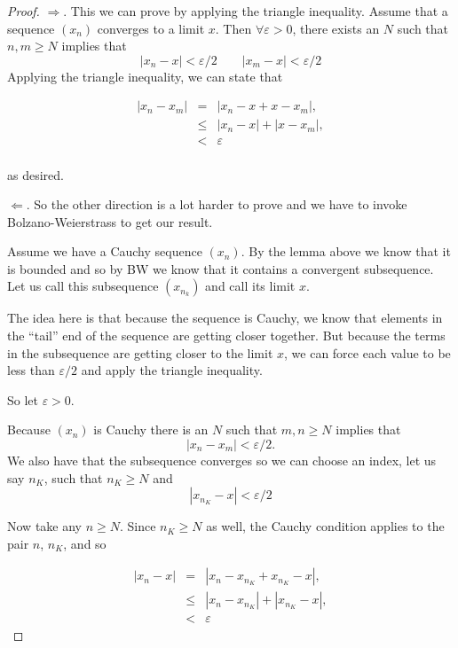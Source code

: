 \begin{proof}
	$\Longrightarrow$.  This we can prove by applying the triangle inequality. Assume that a sequence $(x_n)$ converges to a limit $x$.   Then $\forall \varepsilon >0$, there exists an $N$ such that $n,m \geq N$ implies that 
	\[ |x_n -x | < \varepsilon/2	\qquad 	|x_m - x| < \varepsilon/2	\]
Applying the triangle inequality, we can state that 

$$
\begin{array}{rcl}
|x_n - x_m| &=& |x_n - x  + x - x_m| ,\\
&\leq & |x_n - x| + |x - x_m|,\\
& < & \varepsilon\\
\end{array}
$$

as desired.   

	$\Longleftarrow$.  So the other direction is a lot harder to prove and we have to invoke Bolzano-Weierstrass to get our result.
	
	Assume we have a Cauchy sequence $(x_n)$.  By the lemma above we know that it is bounded and so by BW we know that it contains a convergent subsequence.   Let us call this subsequence $(x_{n_k})$ and call its limit $x$.  
	
	The idea here is that because the sequence is Cauchy, we know that elements in the ``tail'' end of the sequence are getting closer together.  But because the terms in the subsequence are getting closer to the limit $x$, we can force each value to be less than $\varepsilon/2$ and apply the triangle inequality.
	
	So let $\varepsilon >0$.
	
		Because $(x_n)$ is Cauchy there is an $N$ such that $m,n \geq N$ implies that \[|x_n - x_m|<\varepsilon/2.\]  We also have that the subsequence converges so we can choose an index, let us say $n_K$, such that $n_K \geq N$ and 
		\[	|x_{n_K} - x|<\varepsilon/2 \]
		
		
		Now take any $n \geq N$.  Since $n_K \geq N$ as well, the Cauchy condition applies to the pair $n$, $n_K$, and so 
		
				$$
				\begin{array}{rcl}
|x_n - x| &=& |x_n - x_{n_K}  + x_{n_K} - x| ,\\
&\leq & |x_n - x_{n_K}| + |x_{n_K} - x|,\\
& < & \varepsilon
\end{array}
$$
	
\end{proof}



